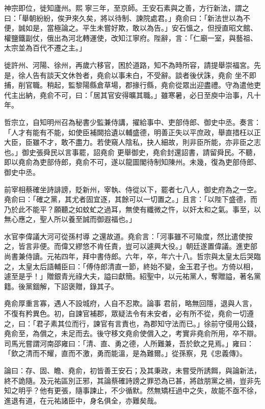 \begin{pinyinscope}
 神宗即位，徙知廬州。熙
 寧三年，至京師。王安石素與之善，方行新法，謂之曰：「舉朝紛紛，俟尹來久矣，將以待制、諫院處君。」堯俞曰：「新法世以為不便，誠如是，當極論之。平生未嘗好欺，敢以為告。」安石慍之，但授直昭文館、權鹽鐵副仗，俄出為河北轉運使，改知江寧府。陛辭，言：「仁廟一室，與藝祖、太宗並為百代不遷之主。」



 徙許州、河陽、徐州，再歲六移官，困於道路，知不為時所容，請提舉崇福宮。先是，徐人告有談天文休咎者，堯俞以事未白，不受辭。談者後伏誅，堯俞
 坐不即捕，削官職。稍起，監黎陽縣倉草場，郡掾行縣，堯俞從眾出迎盡禮。守為遣他吏代主出納，堯俞不可，曰：「居其官安得曠其職。」雖寒暑，必日至庾中治事，凡十年。



 哲宗立，自知明州召為秘書少監兼侍講，擢給事中、吏部侍郎、御史中丞。奏言：「人才有能有不能，如使臣補闕拾遺以輔盛德，明善正失以平庶政，舉直措枉以正大臣，臣雖不才，敢不盡力。若使窺人陰私，抉人細故，則非臣所能，亦非臣之志也。」御史張舜民以言事罷，詔堯俞
 更舉御史，堯俞封還詔書，請留舜民。不聽，即以堯俞為吏部侍郎，堯俞不可，遂以龍圖閣待制知陳州。未幾，復為吏部侍郎、御史中丞。



 前宰相蔡確坐詩誹謗，貶新州，宰執、侍從以下，罷者七八人，御史府為之一空。堯俞曰：「確之黨，其尤者固宜逐，其餘可以一切置之。」且言：「以陛下盛德，而乃於此不能平？願聽之如蚊虻之過耳，無使有纖微之忤，以奸太和之氣。事至，以無心應之，聖人所以養至誠而御遐福也。」



 水官李偉議大河可從孫村導
 之還故道。堯俞言：「河事雖不可隃度，然比遣使按之，皆言非便。而偉又繆悠不肯任責，豈可以遽興大役。」朝廷遂置偉議。進吏部尚書兼侍讀。元祐四年，拜中書侍郎。六年，卒，年六十八。哲宗與太皇太后哭臨之，太皇太后語輔臣曰：「傅侍郎清直一節，終始不變，金玉君子也。方倚以相，遽至是乎！」贈銀青光祿大夫，謚曰獻簡。紹聖中，以元祐黨人，奪贈謚，著名黨籍。後黨錮解，下詔褒贈，錄其子。



 堯俞厚重言寡，遇人不設城府，人自不忍欺。論事
 君前，略無回隱，退與人言，不復有矜異色。初，自諫官補郡，眾疑法令有未安者，必有所不從，堯俞一切遵之，曰：「君子素其位而行，諫官有言責也，為郡知守法而已。」徐前守侵用公錢，堯俞至，為償之，未足而去。後守移文堯俞使償入之，考實非堯俞所用，卒不辯。司馬光嘗謂河南邵雍曰：「清、直、勇之德，人所難兼，吾於欽之見焉。」雍曰：「欽之清而不耀，直而不激，勇而能溫，是為難爾。」從孫察，見《忠義傳》。



 論曰：存、固、瞻、堯俞，初皆善王安石；及其秉政，未嘗受所誘餌，與論新法，終不詭隨。及元祐區別正邪，其論蔡確詩謗之罪恐為已甚，將啟朋黨之禍，豈非先知之明乎？他有更張，隨事諫止，不少循默。然無矯枉過中之失，故能不亟不徐，進退有道，在元祐諸臣中，身名俱全，亦難矣哉。



\end{pinyinscope}